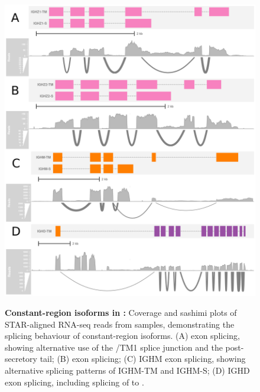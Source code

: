 \begin{figure}
	\includegraphics[width=\textwidth]{_Figures/png/xma-new-locus-sashimi}
	    \begin{subfigure}{0em}
        \label{fig:xma-locus-sashimi-z1}
    \end{subfigure}
    \begin{subfigure}{0em}
        \label{fig:xma-locus-sashimi-z2}
    \end{subfigure}
	\begin{subfigure}{0em}
        \label{fig:xma-locus-sashimi-m}
    \end{subfigure}
    \begin{subfigure}{0em}
        \label{fig:xma-locus-sashimi-d}
    \end{subfigure}
	\caption[Constant-region isoforms in \Xma]{\textbf{Constant-region isoforms in \Xma:} Coverage and sashimi plots of STAR-aligned RNA-seq reads from \Xma samples, demonstrating the splicing behaviour of \igh{} constant-region isoforms. (A)  exon splicing, showing alternative use of the /TM1 splice junction and the post- secretory tail; (B)  exon splicing; (C) IGHM exon splicing, showing alternative splicing patterns of IGHM-TM and IGHM-S; (D) IGHD exon splicing, including splicing of  to .}
	\label{fig:xma-locus-sashimi}
	\end{figure}

